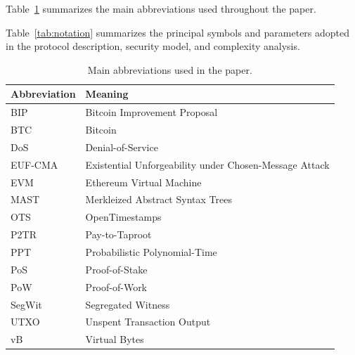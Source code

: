 \documentclass{IEEEoj}
\begin{document}
Table~\ref{tab:abbrev} summarizes the main abbreviations used throughout the paper. 

Table~\ref{tab:notation} summarizes the principal symbols and parameters adopted in the protocol description, security model, and complexity analysis.

\begin{table}[t]
\centering
\caption{Main abbreviations used in the paper.}
\label{tab:abbrev}
\small
\renewcommand{\arraystretch}{1.15}
\begin{tabular}{ll}
\hline
\textbf{Abbreviation} & \textbf{Meaning} \\
\hline
BIP & Bitcoin Improvement Proposal \\
BTC & Bitcoin \\
DoS & Denial-of-Service \\
EUF-CMA & Existential Unforgeability under Chosen-Message Attack \\
EVM & Ethereum Virtual Machine \\
MAST & Merkleized Abstract Syntax Trees \\
OTS & OpenTimestamps \\
P2TR & Pay-to-Taproot \\
PPT & Probabilistic Polynomial-Time \\
PoS & Proof-of-Stake \\
PoW & Proof-of-Work \\
SegWit & Segregated Witness \\
UTXO & Unspent Transaction Output \\
vB & Virtual Bytes \\
\hline
\end{tabular}
\end{table}
\end{document}
